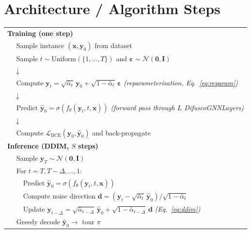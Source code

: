 \documentclass[12pt,a4paper]{article}
\begin{document}
\section{Architecture / Algorithm Steps}

\begin{center}
\begin{tabular}{l}
\textbf{Training (one step)} \\
$\quad$ Sample instance $(\mathbf{x}, \mathbf{y}_0)$ from dataset \\
$\quad$ Sample $t \sim \mathrm{Uniform}(\{1,\ldots,T\})$ and
        $\boldsymbol{\varepsilon} \sim \mathcal{N}(\mathbf{0},\mathbf{I})$ \\
$\quad\downarrow$ \\
$\quad$ Compute $\mathbf{y}_t = \sqrt{\bar{\alpha}_t}\,\mathbf{y}_0
        + \sqrt{1-\bar{\alpha}_t}\,\boldsymbol{\varepsilon}$
        \quad\textit{(reparameterisation, Eq.~\ref{eq:reparam})} \\
$\quad\downarrow$ \\
$\quad$ Predict $\hat{\mathbf{y}}_0 = \sigma(f_\theta(\mathbf{y}_t, t, \mathbf{x}))$
        \quad\textit{(forward pass through $L$ DifuscoGNNLayers)} \\
$\quad\downarrow$ \\
$\quad$ Compute $\mathcal{L}_\mathrm{BCE}(\mathbf{y}_0, \hat{\mathbf{y}}_0)$
        and back-propagate \\[1em]
\textbf{Inference (DDIM, $S$ steps)} \\
$\quad$ Sample $\mathbf{y}_T \sim \mathcal{N}(\mathbf{0},\mathbf{I})$ \\
$\quad$ For $t = T, T{-}\Delta, \ldots, 1$: \\
$\quad\quad$ Predict $\hat{\mathbf{y}}_0 = \sigma(f_\theta(\mathbf{y}_t, t, \mathbf{x}))$ \\
$\quad\quad$ Compute noise direction $\mathbf{d} =
  (\mathbf{y}_t - \sqrt{\bar{\alpha}_t}\,\hat{\mathbf{y}}_0)
  / \sqrt{1-\bar{\alpha}_t}$ \\
$\quad\quad$ Update $\mathbf{y}_{t-\Delta} =
  \sqrt{\bar{\alpha}_{t-\Delta}}\,\hat{\mathbf{y}}_0
  + \sqrt{1-\bar{\alpha}_{t-\Delta}}\,\mathbf{d}$
  \quad\textit{(Eq.~\ref{eq:ddim})} \\
$\quad$ Greedy decode $\hat{\mathbf{y}}_0 \to$ tour $\pi$
\end{tabular}
\end{center}
\end{document}
